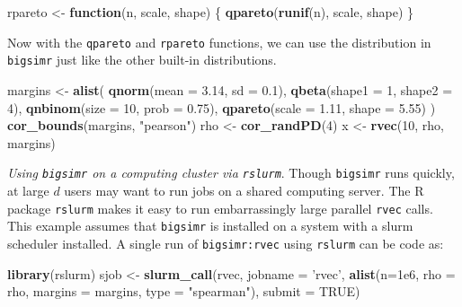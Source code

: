 \documentclass[]{article}
\newenvironment{Shaded}{\begin{snugshade}}{\end{snugshade}}
\newcommand{\ControlFlowTok}[1]{\textcolor[rgb]{0.13,0.29,0.53}{\textbf{#1}}}
\newcommand{\DataTypeTok}[1]{\textcolor[rgb]{0.13,0.29,0.53}{#1}}
\newcommand{\DecValTok}[1]{\textcolor[rgb]{0.00,0.00,0.81}{#1}}
\newcommand{\FloatTok}[1]{\textcolor[rgb]{0.00,0.00,0.81}{#1}}
\newcommand{\KeywordTok}[1]{\textcolor[rgb]{0.13,0.29,0.53}{\textbf{#1}}}
\newcommand{\NormalTok}[1]{#1}
\newcommand{\OtherTok}[1]{\textcolor[rgb]{0.56,0.35,0.01}{#1}}
\newcommand{\StringTok}[1]{\textcolor[rgb]{0.31,0.60,0.02}{#1}}
\begin{document}
\begin{Shaded}
\begin{Highlighting}[]
\NormalTok{rpareto <-}\StringTok{ }\ControlFlowTok{function}\NormalTok{(n, scale, shape) \{}
  \KeywordTok{qpareto}\NormalTok{(}\KeywordTok{runif}\NormalTok{(n), scale, shape)}
\NormalTok{\}}
\end{Highlighting}
\end{Shaded}

Now with the \texttt{qpareto} and \texttt{rpareto} functions, we can use the distribution in \texttt{bigsimr} just like the other built-in distributions.

\begin{Shaded}
\begin{Highlighting}[]
\NormalTok{margins <-}\StringTok{ }\KeywordTok{alist}\NormalTok{(}
  \KeywordTok{qnorm}\NormalTok{(}\DataTypeTok{mean =} \FloatTok{3.14}\NormalTok{, }\DataTypeTok{sd =} \FloatTok{0.1}\NormalTok{),}
  \KeywordTok{qbeta}\NormalTok{(}\DataTypeTok{shape1 =} \DecValTok{1}\NormalTok{, }\DataTypeTok{shape2 =} \DecValTok{4}\NormalTok{),}
  \KeywordTok{qnbinom}\NormalTok{(}\DataTypeTok{size =} \DecValTok{10}\NormalTok{, }\DataTypeTok{prob =} \FloatTok{0.75}\NormalTok{),}
  \KeywordTok{qpareto}\NormalTok{(}\DataTypeTok{scale =} \FloatTok{1.11}\NormalTok{, }\DataTypeTok{shape =} \FloatTok{5.55}\NormalTok{)}
\NormalTok{)}
\KeywordTok{cor_bounds}\NormalTok{(margins, }\StringTok{"pearson"}\NormalTok{)}
\NormalTok{rho <-}\StringTok{ }\KeywordTok{cor_randPD}\NormalTok{(}\DecValTok{4}\NormalTok{)}
\NormalTok{x <-}\StringTok{ }\KeywordTok{rvec}\NormalTok{(}\DecValTok{10}\NormalTok{, rho, margins)}
\end{Highlighting}
\end{Shaded}

\emph{Using \texttt{bigsimr} on a computing cluster via \texttt{rslurm}}.
Though \texttt{bigsimr} runs quickly, at large \(d\) users may want to run jobs on a shared computing server.
The R package \texttt{rslurm} makes it easy to run embarrassingly large parallel \texttt{rvec} calls.
This example assumes that \texttt{bigsimr} is installed on a system with a slurm scheduler installed.
A single run of \texttt{bigsimr:rvec} using \texttt{rslurm} can be code as:

\begin{Shaded}
\begin{Highlighting}[]
\KeywordTok{library}\NormalTok{(rslurm)}
\NormalTok{sjob <-}\StringTok{ }\KeywordTok{slurm_call}\NormalTok{(rvec, }\DataTypeTok{jobname =} \StringTok{'rvec'}\NormalTok{,}
                   \KeywordTok{alist}\NormalTok{(}\DataTypeTok{n=}\FloatTok{1e6}\NormalTok{,}
                         \DataTypeTok{rho =}\NormalTok{ rho,}
                        \DataTypeTok{margins =}\NormalTok{ margins,}
                        \DataTypeTok{type =} \StringTok{"spearman"}\NormalTok{),}
                   \DataTypeTok{submit =} \OtherTok{TRUE}\NormalTok{)}
\end{Highlighting}
\end{Shaded}
\end{document}
